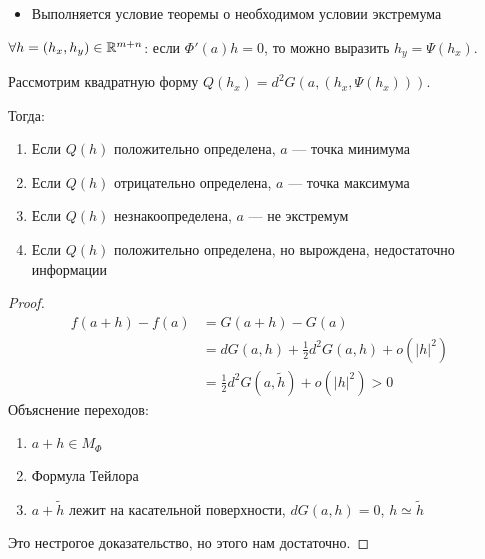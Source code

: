 

\cfoot{}



\begin{theorem}\itemfix
    \begin{itemize}
        \item Выполняется условие теоремы о необходимом условии экстремума
    \end{itemize}
    $\forall h=(h_x, h_y)\in\mathbb{R}^{m+n}$: если $\Phi'(a)h=0$, то можно выразить $h_y = \Psi(h_x)$.

    Рассмотрим квадратную форму $Q(h_x) = d^2 G(a, (h_x, \Psi(h_x)))$.

    Тогда:
    \begin{enumerate}
        \item Если $Q(h)$ положительно определена, $a$ --- точка минимума
        \item Если $Q(h)$ отрицательно определена, $a$ --- точка максимума
        \item Если $Q(h)$ незнакоопределена, $a$ --- не экстремум
        \item Если $Q(h)$ положительно определена, но вырождена, недостаточно информации
    \end{enumerate}
\end{theorem}
\begin{proof}
    \begin{align}
        f(a+h) - f(a) & = G(a+h) - G(a)                                \\
                      & = dG(a, h) + \frac{1}{2}d^2 G(a, h) + o(|h|^2) \\
                      & = \frac{1}{2}d^2G(a, \tilde h) + o(|h|^2) > 0
    \end{align}
    Объяснение переходов:
    \begin{enumerate}
        \item $a+h\in M_\Phi$
        \item Формула Тейлора
        \item $a + \tilde h$ лежит на касательной поверхности, $dG(a, h) = 0$, $h\simeq \tilde h$
    \end{enumerate}

    Это нестрогое доказательство, но этого нам достаточно.
\end{proof}

